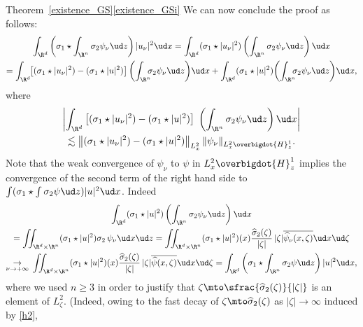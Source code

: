 \begin{ProofOf}{Theorem~\ref{existence_GS}\eqref{existence_GSi}}
We can now conclude the proof as follows:
\bgroup
{}
\begin{multline*}
\int_{\R^{d}}\left(\sigma_{1}\star\int_{\R^{n}}\sigma_{2}\psi_{\nu}\ud z\right)|u_{\nu}|^{2}\ud x=\int_{\R^{d}}(\sigma_{1}\star|u_{\nu}|^{2})\left(\int_{\R^{n}}\sigma_{2}\psi_{\nu}\ud z\right)\ud x\\
=\int_{\R^{d}}\hspace*{-1mm}\left[(\sigma_{1}\star|u_{\nu}|^{2})-(\sigma_{1}\star|u|^{2})\right]\biggl(\int_{\R^{n}}\hspace*{-2mm}\sigma_{2}\psi_{\nu}\ud z\biggr)\ud x+\int_{\R^{d}}(\sigma_{1}\star|u|^{2})\biggl(\int_{\R^{n}}\hspace*{-2mm}\sigma_{2}\psi_{\nu}\ud z\biggr)\ud x,
\end{multline*}
\egroup
where
\begin{multline*}
\left|\int_{\R^{d}}\left[(\sigma_{1}\star|u_{\nu}|^{2})-(\sigma_{1}\star|u|^{2})\right]\;\left(\int_{\R^{n}}\sigma_{2}\psi_{\nu}\ud z\right)\ud x\right|\\
\lesssim\left\|(\sigma_{1}\star|u_{\nu}|^{2})-(\sigma_{1}\star|u|^{2})\right\|_{L_{x}^{2}}\|\psi_{\nu}\|_{L_{x}^{2}\overbigdot{H}_{z}^{1}}.
\end{multline*}
Note that the weak convergence of $\psi_{\nu}$ to $\psi$ in $L_{x}^{2}\overbigdot{H}_{z}^{1}$ implies the convergence of the second term of the right hand side to $\int(\sigma_{1}\star\int\sigma_{2}\psi\ud z)|u|^{2}\ud x$. Indeed
\bgroup
{}
\begin{multline*}
\int_{\R^{d}}(\sigma_{1}\star|u|^{2})\left(\int_{\R^{n}}\sigma_{2}\psi_{\nu}\ud z\right)\ud x\\
=\iint_{\R^{d}\times\R^{n}}(\sigma_{1}\star|u|^{2})\sigma_{2}\,\psi_{\nu}\ud x\ud z
=\iint_{\R^{d}\times\R^{n}} (\sigma_{1}
\star|u|^{2})(x)\frac{\widehat{\sigma}_{2}(\zeta)}{ |\zeta|} \,|\zeta|\overline{\widehat{\psi}_{\nu}(x,\zeta)}\ud x\ud \zeta\\
\underset{\nu\to +\infty}{\to}\,\iint_{\R^{d}\times\R^{n}}
(\sigma_{1}\star|u|^{2})(x)\frac{\widehat{\sigma}_{2}(\zeta)}{ |\zeta|}\, |\zeta|\overline{\widehat{\psi}(x,\zeta)}\ud x\ud\zeta
=\int_{\R^{d}}\left(\sigma_{1}\star\int_{\R^{n}}\sigma_{2}\psi\ud z\right)|u|^{2}\ud x,
\end{multline*}
\egroup
where we used $n\geq 3$ in order to justify that $\zeta\mto\sfrac{\widehat{\sigma}_{2}(\zeta)}{|\zeta|}$ is an element of $L_{\zeta}^{2}$.
(Indeed, owing to the fast decay of $\zeta\mto \widehat{\sigma}_{2}(\zeta)$ as $|\zeta|\to \infty$ induced by \eqref{h2},

\end{ProofOf}
